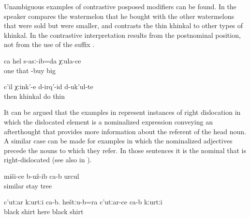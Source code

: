 Unambiguous examples of contrastive posposed modifiers can be found. In  the speaker compares the watermelon that he bought with the other watermelons that were sold but were smaller, and  contrasts the thin khinkal to other types of khinkal. In  the contrastive interpretation results from the postnominal position, not from the use of the suffix . 
%
\begin{exe}

	\ex	\label{ex:‎‎I took one, a big one}
	\gll	ca	hel	s-asː-ib=da	χːula-ce\\
		one	that	-buy	big\\
	\glt	{} 

		\ex	\label{ex:Then we make khinkal, the thin one}
		\gll	c'il	χːink'-e	d-irq'-id	d-uk'ul-te\\
			then	khinkal	do	thin\\
		\glt	{}
		
\end{exe}


It can be argued that the examples in  represent instances of right dislocation in which the dislocated element is a nominalized expression conveying an afterthought that provides more information about the referent of the head noun. A similar case can be made for examples in which the nominalized adjectives precede the nouns to which they refer. In those sentences it is the nominal that is right-dislocated  (see also  in ).
%
\begin{exe}
	\ex	\label{ex:There turned out to be a similar tree@20a}
	\gll	miši-ce	b-už-ib	ca-b	urcul\\
		similar	stay		tree\\
	\glt	{}

	\ex	\label{ex:This is a black shirt. And here this is also a black shirt@20b}
	\gll	c'utːar	kːurtːi	ca-b.	heštːu-b=ra	c'utːar-ce	ca-b	kːurtːi\\
		black	shirt		here	black		shirt\\
	\glt	{}
\end{exe}

